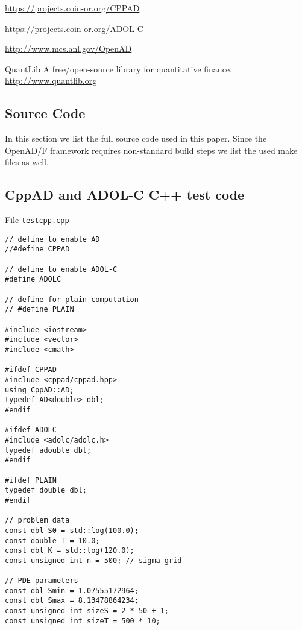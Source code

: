 \documentclass{amsart}
\theoremstyle{plain}
\numberwithin{equation}{section}
\begin{document}
\begin{thebibliography}{4}

\url{https://projects.coin-or.org/CPPAD}

\url{https://projects.coin-or.org/ADOL-C}

\url{http://www.mcs.anl.gov/OpenAD}

QuantLib A free/open-source library for quantitative finance, \url{http://www.quantlib.org}

\end{thebibliography}

\begin{appendix}

\section{Source Code}

In this section we list the full source code used in this paper. Since the OpenAD/F framework requires non-standard build steps we list the used make files as well.

\subsection{CppAD and ADOL-C C++ test code}

File \verb+testcpp.cpp+

\begin{verbatim}
// define to enable AD
//#define CPPAD

// define to enable ADOL-C
#define ADOLC

// define for plain computation
// #define PLAIN

#include <iostream>
#include <vector>
#include <cmath>

#ifdef CPPAD
#include <cppad/cppad.hpp>
using CppAD::AD;
typedef AD<double> dbl;
#endif

#ifdef ADOLC
#include <adolc/adolc.h>
typedef adouble dbl;
#endif

#ifdef PLAIN
typedef double dbl;
#endif

// problem data
const dbl S0 = std::log(100.0);
const double T = 10.0;
const dbl K = std::log(120.0);
const unsigned int n = 500; // sigma grid

// PDE parameters
const dbl Smin = 1.07555172964;
const dbl Smax = 8.13478864234;
const unsigned int sizeS = 2 * 50 + 1;
const unsigned int sizeT = 500 * 10;


\end{verbatim}
\end{appendix}
\end{document}
